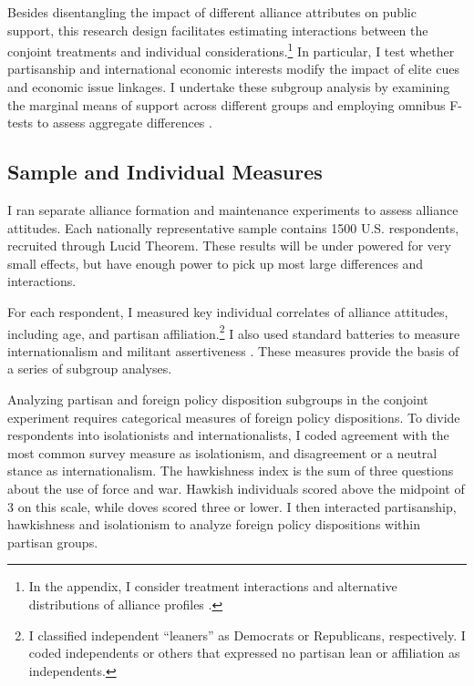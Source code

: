 \documentclass[12pt]{article}
\begin{document}
Besides disentangling the impact of different alliance attributes on public support, this research design facilitates estimating interactions between the conjoint treatments and individual considerations.\footnote{In the appendix, I consider treatment interactions and alternative distributions of alliance profiles \citep{delaCuestaetal2021}.}
In particular, I test whether partisanship and international economic interests modify the impact of elite cues and economic issue linkages. 
I undertake these subgroup analysis by examining the marginal means of support across different groups and employing omnibus F-tests to assess aggregate differences \citep{Leeperetal2020}. 



\subsection{Sample and Individual Measures}


I ran separate alliance formation and maintenance experiments to assess alliance attitudes. 
Each nationally representative sample contains 1500 U.S. respondents, recruited through Lucid Theorem.
These results will be under powered for very small effects, but have enough power to pick up most large differences and interactions. 


For each respondent, I measured key individual correlates of alliance attitudes, including age, and partisan affiliation.\footnote{I classified independent ``leaners'' as Democrats or Republicans, respectively. I coded independents or others that expressed no partisan lean or affiliation as independents.}
I also used standard batteries to measure internationalism and militant assertiveness \citep{Herrmannetal1999, KertzerBrutger2016}.
These measures provide the basis of a series of subgroup analyses. 


Analyzing partisan and foreign policy disposition subgroups in the conjoint experiment requires categorical measures of foreign policy dispositions. 
To divide respondents into isolationists and internationalists, I coded agreement with the most common survey measure as isolationism, and disagreement or a neutral stance as internationalism. 
The hawkishness index is the sum of three questions about the use of force and war. 
Hawkish individuals scored above the midpoint of 3 on this scale, while doves scored three or lower. 
I then interacted partisanship, hawkishness and isolationism to analyze foreign policy dispositions within partisan groups.
\end{document}
